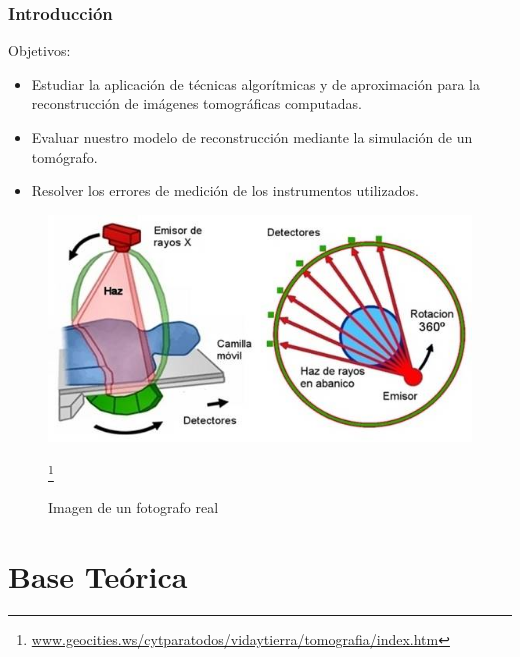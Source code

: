 \documentclass{beamer}
\begin{document}
\begin{frame}
\frametitle{Introducción}
Objetivos:
\begin{itemize}
	\item Estudiar la aplicación de técnicas algorítmicas y de aproximación para la reconstrucción de imágenes tomográficas computadas.
	\item Evaluar nuestro modelo de reconstrucción mediante la simulación de un tomógrafo.
	\item Resolver los errores de medición de los instrumentos utilizados.
\end{itemize}
    \begin{figure}
      \centering
      \includegraphics[height=0.35\textheight]{imagenes/tomografo.png}
	\caption{Imagen de un fotografo real}
\footnote{\url{www.geocities.ws/cytparatodos/vidaytierra/tomografia/index.htm}}
    \end{figure}
 
 
\end{frame}

\section{Base Teórica}
\end{document}
